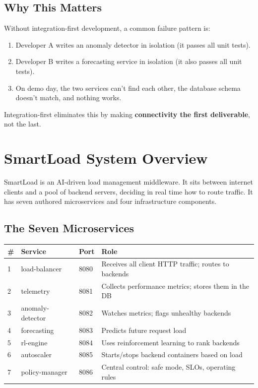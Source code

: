 \documentclass[12pt, a4paper]{article}
\begin{document}
\subsection{Why This Matters}

Without integration-first development, a common failure pattern is:
\begin{enumerate}
  \item Developer A writes an anomaly detector in isolation (it passes all unit
        tests).
  \item Developer B writes a forecasting service in isolation (it also passes
        all unit tests).
  \item On demo day, the two services can't find each other, the database
        schema doesn't match, and nothing works.
\end{enumerate}

Integration-first eliminates this by making \textbf{connectivity the first
deliverable}, not the last.

\section{SmartLoad System Overview}

SmartLoad is an AI-driven load management middleware. It sits between internet
clients and a pool of backend servers, deciding in real time how to route
traffic. It has seven authored microservices and four infrastructure components.

\subsection{The Seven Microservices}

\begin{center}
\begin{tabularx}{\textwidth}{lllX}
  \toprule
  \textbf{\#} & \textbf{Service} & \textbf{Port} & \textbf{Role} \\
  \midrule
  1 & load-balancer    & 8080 & Receives all client HTTP traffic; routes to backends \\
  2 & telemetry        & 8081 & Collects performance metrics; stores them in the DB \\
  3 & anomaly-detector & 8082 & Watches metrics; flags unhealthy backends \\
  4 & forecasting      & 8083 & Predicts future request load \\
  5 & rl-engine        & 8084 & Uses reinforcement learning to rank backends \\
  6 & autoscaler       & 8085 & Starts/stops backend containers based on load \\
  7 & policy-manager   & 8086 & Central control: safe mode, SLOs, operating rules \\
  \bottomrule
\end{tabularx}
\end{center}
\end{document}
